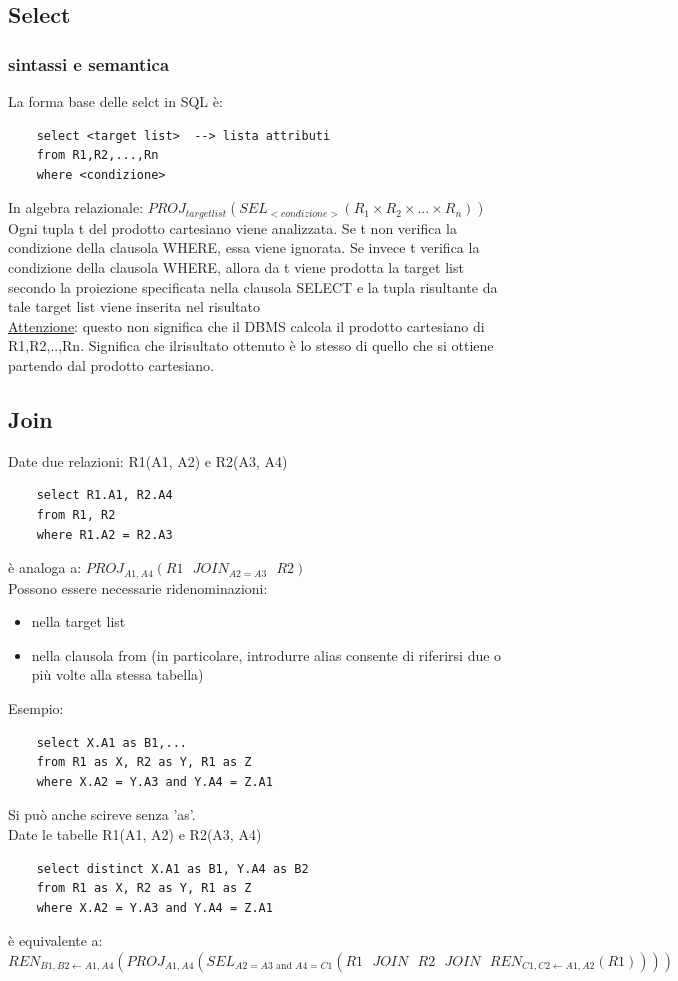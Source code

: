\subsection{Select}
\subsubsection{sintassi e semantica}
La forma base delle selct in SQL è:
\begin{verbatim}
    select <target list>  --> lista attributi
    from R1,R2,...,Rn
    where <condizione>
\end{verbatim}
\noindent In algebra relazionale: $PROJ_{target list}(SEL_{<condizione>}(R_1 \times R_2 \times ... \times R_n))$\\
Ogni tupla t del prodotto cartesiano viene analizzata. Se t non verifica la condizione della clausola WHERE, essa viene ignorata. Se invece t verifica la condizione della clausola 
WHERE, allora da t viene prodotta la target list secondo la proiezione specificata nella clausola SELECT e la tupla risultante da tale target list viene inserita nel risultato\\
\underline{Attenzione}: questo non significa che il DBMS calcola il prodotto cartesiano di R1,R2,..,Rn. Significa che ilrisultato ottenuto è lo stesso di quello che si ottiene partendo dal prodotto cartesiano.
\subsection{Join}
Date due relazioni: R1(A1, A2) e R2(A3, A4)
\begin{verbatim}
    select R1.A1, R2.A4
    from R1, R2
    where R1.A2 = R2.A3
\end{verbatim}
\noindent è analoga a: $PROJ_{A1,A4}(R1 \text{ }JOIN_{A2=A3}\text{ }R2)$\\
Possono essere necessarie ridenominazioni:
\begin{itemize}
    \item nella target list
    \item nella clausola from (in particolare, introdurre alias consente di riferirsi due o più volte alla stessa tabella)
\end{itemize}
\noindent \textcolor{verdeEsempio}{Esempio:}
\begin{verbatim}
    select X.A1 as B1,...
    from R1 as X, R2 as Y, R1 as Z
    where X.A2 = Y.A3 and Y.A4 = Z.A1
\end{verbatim}
\noindent Si può anche scireve senza 'as'.\medskip\\
Date le tabelle R1(A1, A2) e R2(A3, A4)
\begin{verbatim}
    select distinct X.A1 as B1, Y.A4 as B2
    from R1 as X, R2 as Y, R1 as Z
    where X.A2 = Y.A3 and Y.A4 = Z.A1 
\end{verbatim}
\noindent è equivalente a:
$REN_{B1,B2 \leftarrow A1,A4}( PROJ_{A1,A4} (SEL_{A2=A3 \text{ and }A4=C1 }( R1 \text{ }JOIN\text{ }R2\text{ }JOIN\text{ }REN_{C1,C2 \leftarrow A1,A2}(R1))))$
